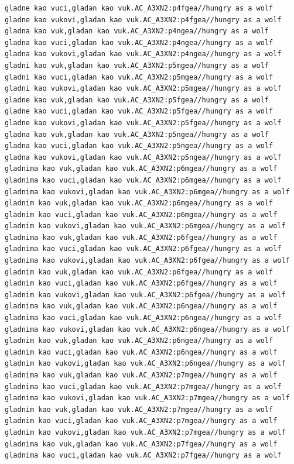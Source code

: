 \begin{verbatim}
gladne kao vuci,gladan kao vuk.AC_A3XN2:p4fgea//hungry as a wolf
gladne kao vukovi,gladan kao vuk.AC_A3XN2:p4fgea//hungry as a wolf
gladna kao vuk,gladan kao vuk.AC_A3XN2:p4ngea//hungry as a wolf
gladna kao vuci,gladan kao vuk.AC_A3XN2:p4ngea//hungry as a wolf
gladna kao vukovi,gladan kao vuk.AC_A3XN2:p4ngea//hungry as a wolf
gladni kao vuk,gladan kao vuk.AC_A3XN2:p5mgea//hungry as a wolf
gladni kao vuci,gladan kao vuk.AC_A3XN2:p5mgea//hungry as a wolf
gladni kao vukovi,gladan kao vuk.AC_A3XN2:p5mgea//hungry as a wolf
gladne kao vuk,gladan kao vuk.AC_A3XN2:p5fgea//hungry as a wolf
gladne kao vuci,gladan kao vuk.AC_A3XN2:p5fgea//hungry as a wolf
gladne kao vukovi,gladan kao vuk.AC_A3XN2:p5fgea//hungry as a wolf
gladna kao vuk,gladan kao vuk.AC_A3XN2:p5ngea//hungry as a wolf
gladna kao vuci,gladan kao vuk.AC_A3XN2:p5ngea//hungry as a wolf
gladna kao vukovi,gladan kao vuk.AC_A3XN2:p5ngea//hungry as a wolf
gladnima kao vuk,gladan kao vuk.AC_A3XN2:p6mgea//hungry as a wolf
gladnima kao vuci,gladan kao vuk.AC_A3XN2:p6mgea//hungry as a wolf
gladnima kao vukovi,gladan kao vuk.AC_A3XN2:p6mgea//hungry as a wolf
gladnim kao vuk,gladan kao vuk.AC_A3XN2:p6mgea//hungry as a wolf
gladnim kao vuci,gladan kao vuk.AC_A3XN2:p6mgea//hungry as a wolf
gladnim kao vukovi,gladan kao vuk.AC_A3XN2:p6mgea//hungry as a wolf
gladnima kao vuk,gladan kao vuk.AC_A3XN2:p6fgea//hungry as a wolf
gladnima kao vuci,gladan kao vuk.AC_A3XN2:p6fgea//hungry as a wolf
gladnima kao vukovi,gladan kao vuk.AC_A3XN2:p6fgea//hungry as a wolf
gladnim kao vuk,gladan kao vuk.AC_A3XN2:p6fgea//hungry as a wolf
gladnim kao vuci,gladan kao vuk.AC_A3XN2:p6fgea//hungry as a wolf
gladnim kao vukovi,gladan kao vuk.AC_A3XN2:p6fgea//hungry as a wolf
gladnima kao vuk,gladan kao vuk.AC_A3XN2:p6ngea//hungry as a wolf
gladnima kao vuci,gladan kao vuk.AC_A3XN2:p6ngea//hungry as a wolf
gladnima kao vukovi,gladan kao vuk.AC_A3XN2:p6ngea//hungry as a wolf
gladnim kao vuk,gladan kao vuk.AC_A3XN2:p6ngea//hungry as a wolf
gladnim kao vuci,gladan kao vuk.AC_A3XN2:p6ngea//hungry as a wolf
gladnim kao vukovi,gladan kao vuk.AC_A3XN2:p6ngea//hungry as a wolf
gladnima kao vuk,gladan kao vuk.AC_A3XN2:p7mgea//hungry as a wolf
gladnima kao vuci,gladan kao vuk.AC_A3XN2:p7mgea//hungry as a wolf
gladnima kao vukovi,gladan kao vuk.AC_A3XN2:p7mgea//hungry as a wolf
gladnim kao vuk,gladan kao vuk.AC_A3XN2:p7mgea//hungry as a wolf
gladnim kao vuci,gladan kao vuk.AC_A3XN2:p7mgea//hungry as a wolf
gladnim kao vukovi,gladan kao vuk.AC_A3XN2:p7mgea//hungry as a wolf
gladnima kao vuk,gladan kao vuk.AC_A3XN2:p7fgea//hungry as a wolf
gladnima kao vuci,gladan kao vuk.AC_A3XN2:p7fgea//hungry as a wolf

\end{verbatim}
